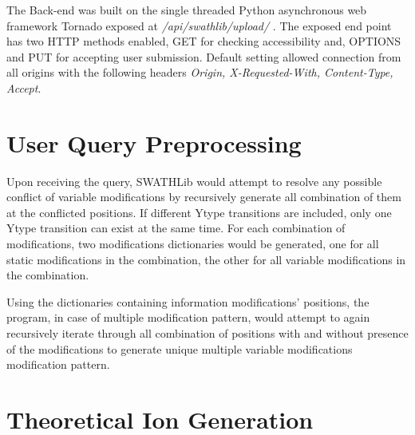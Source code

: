 \documentclass[../manual.tex]{subfiles}
\begin{document}
The Back-end was built on the single threaded Python asynchronous web framework Tornado exposed at \emph{/api/swathlib/upload/} . The exposed end point has two HTTP methods enabled, GET for checking accessibility and, OPTIONS and PUT for accepting user submission. Default setting allowed connection from all origins with the following headers \emph{Origin, X-Requested-With, Content-Type, Accept}.

\section{User Query Preprocessing}
Upon receiving the query, SWATHLib would attempt to resolve any possible conflict of variable modifications by recursively generate all combination of them at the conflicted positions. If different Ytype transitions are included, only one Ytype transition can exist at the same time. For each combination of modifications, two modifications dictionaries would be generated, one for all static modifications in the combination, the other for all variable modifications in the combination.\par

Using the dictionaries containing information modifications' positions, the program, in case of multiple modification pattern, would attempt to again recursively iterate through all combination of positions with and without presence of the modifications to generate unique multiple variable modifications modification pattern.  

\section{Theoretical Ion Generation}
\end{document}
